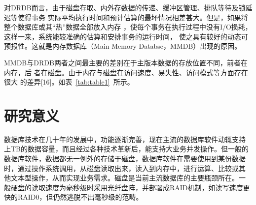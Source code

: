 \documentclass[literaturereview]{zjutreport}
\begin{document}
对DRDB而言，由于磁盘存取、内外存数据的传递、缓冲区管理、排队等待及锁延迟等使得事务
实际平均执行时间和预计估算的最坏情况相差甚大。但是，如果将整个数据库或其“热”数据全部放入内存
，使每个事务在执行过程中没有I/O损耗，这样一来，系统能较准确的估算和安排事务的运行时间，
使之具有较好的动态可预报性。这就是内存数据库（Main Memory Databse，MMDB）出现的原因。

MMDB与DRDB两者之间最主要的差别在于主版本数据的存放位置不同，前者在内存，后
者在磁盘。由于内存与磁盘在访问速度、易失性、访问模式等方面存在很大
的差异[16]。如表~\ref{tab:table1}~所示。

\begin{table}[htbp]
\caption{MMDB和DRDB的差别}\label{tab:table1}
\vspace{\baselineskip}
\end{table}

\chapter{研究意义}
数据库技术在几十年的发展中，功能逐渐完善，现在主流的数据库软件动辄支持
上TB的数据容量，而且经过各种技术革新后，能支持大业务并发操作。但一般的
数据库软件，数据都无一例外的存储于磁盘，数据库软件在需要使用到某份数据
时，通过操作系统调用，从磁盘读取出来，读入到内存中，进行运算、比较或其
他文本型操作，从而实现业务需求。磁盘是当前主流数据库的主要瓶颈所在。一
般硬盘的读取速度为毫秒级时采用光纤盘阵，并部署成RAID机制，如读写速度更
快的RAID0，但仍然逃脱不出毫秒级的范畴。
\end{document}
